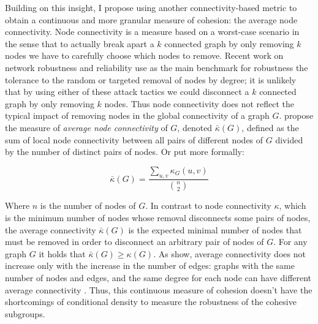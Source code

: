 Building on this insight, I propose using another connectivity-based metric to obtain a continuous and more granular measure of cohesion: the average node connectivity. Node connectivity is a measure based on a worst-case scenario in the sense that to actually break apart a $k$ connected graph by only removing $k$ nodes we have to carefully choose which nodes to remove. Recent work on network robustness and reliability \citep*{albert:2000,dodds:2003} use as the main benchmark for robustness the tolerance to the random or targeted removal of nodes by degree; it is unlikely that by using either of these attack tactics we could disconnect a $k$ connected graph by only removing $k$ nodes. Thus node connectivity does not reflect the typical impact of removing nodes in the global connectivity of a graph $G$. \citet*{beineke:2002} propose the measure of \emph{average node connectivity} of $G$, denoted $\bar{\kappa}(G)$, defined as the sum of local node connectivity between all pairs of different nodes of $G$ divided by the number of distinct pairs of nodes. Or put more formally:

\begin{equation}
\bar{\kappa}(G) = \frac{\sum_{u,v} \kappa_{G}(u,v)}{{n \choose 2}}
\end{equation}

Where $n$ is the number of nodes of $G$. In contrast to node connectivity $\kappa$, which is the minimum number of nodes whose removal disconnects some pairs of nodes, the average connectivity $\bar{\kappa}(G)$ is the expected minimal number of nodes that must be removed in order to disconnect an arbitrary pair of nodes of $G$. For any graph $G$ it holds that $\bar{\kappa}(G) \ge \kappa(G)$. As \citeauthor{beineke:2002} show, average connectivity does not increase only with the increase in the number of edges: graphs with the same number of nodes and edges, and the same degree for each node can have different average connectivity \citep[figure 2, 33]{beineke:2002}. Thus, this continuous measure of cohesion doesn't have the shortcomings of conditional density to measure the robustness of the cohesive subgroups.

